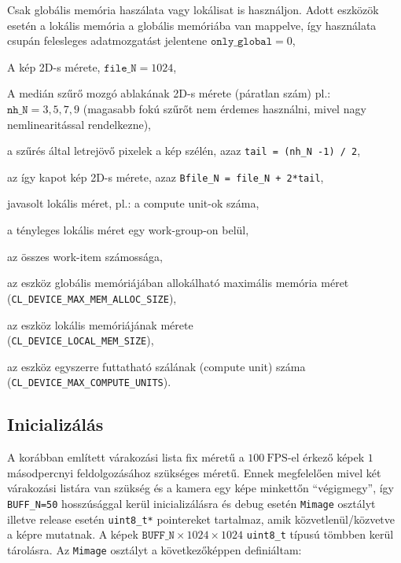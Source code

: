 	\begin{description}[noitemsep]
	\item[only\_global] Csak globális memória haszálata vagy lokálisat is használjon. Adott eszközök esetén a lokális memória a
	globális memóriába van mappelve, így használata csupán felesleges adatmozgatást jelentene $\texttt{only\_global} = 0$,
	\item[file\_N] A kép 2D-s mérete, $\texttt{file\_N} = 1024$,
	\item[nh\_N] A medián szűrő mozgó ablakának 2D-s mérete (páratlan szám) pl.: $\texttt{nh\_N} = 3,5,7,9$ (magasabb fokú szűrőt
	nem érdemes használni, mivel nagy nemlinearitással rendelkezne),
	\item[tail] a szűrés által letrejövő pixelek a kép szélén, azaz \texttt{tail = (nh\_N -1) / 2},
	\item[Bfile\_N] az így kapot kép 2D-s mérete, azaz \texttt{Bfile\_N = file\_N + 2*tail},
	\item[pplN] javasolt lokális méret, pl.: a compute unit-ok száma,
	\item[localN] a tényleges lokális méret egy work-group-on belül,
	\item[globalN] az összes work-item számossága,
	\item[aSize] az eszköz globális memóriájában allokálható maximális memória méret\\
		(\texttt{CL\_DEVICE\_MAX\_MEM\_ALLOC\_SIZE}),
	\item[lSize] az eszköz lokális memóriájának mérete\\
		(\texttt{CL\_DEVICE\_LOCAL\_MEM\_SIZE}),
	\item[mCuint] az eszköz egyszerre futtatható szálának (compute unit) száma \\
		(\texttt{CL\_DEVICE\_MAX\_COMPUTE\_UNITS}).
	\end{description}
	

	\subsection*{Inicializálás}
	A korábban említett várakozási lista fix méretű a $100\ \mathrm{FPS}$-el érkező képek $1$ másodpercnyi feldolgozásához szükséges
	méretű. Ennek megfelelően mivel két várakozási listára van szükség és a kamera egy képe minkettőn ``végigmegy'', így
	\texttt{BUFF\_N=50} hosszúsággal kerül inicializálásra és debug esetén \texttt{Mimage} osztályt illetve release esetén
	\texttt{uint8\_t*} pointereket tartalmaz, amik közvetlenül/közvetve a képre mutatnak.
	A képek $\texttt{BUFF\_N} \times 1024 \times 1024$ \texttt{uint8\_t} típusú tömbben kerül tárolásra.
	Az \texttt{Mimage} osztályt a következőképpen definiáltam:
	
